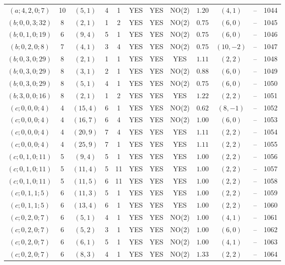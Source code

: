 \begin{longtable}{|c|c|c|c|c|c|c|c|c|c|c|c|}
$(a;4,2,0;7)$ & 10 & $(5,1)$ & 4 & 1 & YES & YES & NO(2) & $1.20$ & $(4,1)$ & -- & 1044\\
$(b;0,0,3;32)$ & 8 & $(2,1)$ & 1 & 2 & YES & YES & NO(2) & $0.75$ & $(6,0)$ & -- & 1045\\
$(b;0,1,0;19)$ & 6 & $(9,4)$ & 5 & 1 & YES & YES & NO(2) & $0.75$ & $(6,0)$ & -- & 1046\\
$(b;0,2,0;8)$ & 7 & $(4,1)$ & 3 & 4 & YES & YES & NO(2) & $0.75$ & $(10,-2)$ & -- & 1047\\
$(b;0,3,0;29)$ & 8 & $(2,1)$ & 1 & 1 & YES & YES & YES & $1.11$ & $(2,2)$ & -- & 1048\\
$(b;0,3,0;29)$ & 8 & $(3,1)$ & 2 & 1 & YES & YES & NO(2) & $0.88$ & $(6,0)$ & -- & 1049\\
$(b;0,3,0;29)$ & 8 & $(5,1)$ & 4 & 1 & YES & YES & NO(2) & $0.75$ & $(6,0)$ & -- & 1050\\
$(b;3,0,0;16)$ & 8 & $(2,1)$ & 1 & 2 & YES & YES & YES & $1.22$ & $(2,2)$ & -- & 1051\\
$(c;0,0,0;4)$ & 4 & $(15,4)$ & 6 & 1 & YES & YES & NO(2) & $0.62$ & $(8,-1)$ & -- & 1052\\
$(c;0,0,0;4)$ & 4 & $(16,7)$ & 6 & 4 & YES & YES & NO(2) & $1.00$ & $(6,0)$ & -- & 1053\\
$(c;0,0,0;4)$ & 4 & $(20,9)$ & 7 & 4 & YES & YES & YES & $1.11$ & $(2,2)$ & -- & 1054\\
$(c;0,0,0;4)$ & 4 & $(25,9)$ & 7 & 1 & YES & YES & YES & $1.11$ & $(2,2)$ & -- & 1055\\
$(c;0,1,0;11)$ & 5 & $(9,4)$ & 5 & 1 & YES & YES & YES & $1.00$ & $(2,2)$ & -- & 1056\\
$(c;0,1,0;11)$ & 5 & $(11,4)$ & 5 & 11 & YES & YES & YES & $1.00$ & $(2,2)$ & -- & 1057\\
$(c;0,1,0;11)$ & 5 & $(11,5)$ & 6 & 11 & YES & YES & YES & $1.00$ & $(2,2)$ & -- & 1058\\
$(c;0,1,1;5)$ & 6 & $(11,3)$ & 5 & 1 & YES & YES & YES & $1.00$ & $(2,2)$ & -- & 1059\\
$(c;0,1,1;5)$ & 6 & $(13,4)$ & 6 & 1 & YES & YES & YES & $1.00$ & $(2,2)$ & -- & 1060\\
$(c;0,2,0;7)$ & 6 & $(5,1)$ & 4 & 1 & YES & YES & NO(2) & $1.00$ & $(4,1)$ & -- & 1061\\
$(c;0,2,0;7)$ & 6 & $(5,2)$ & 3 & 1 & YES & YES & NO(2) & $1.00$ & $(6,0)$ & -- & 1062\\
$(c;0,2,0;7)$ & 6 & $(6,1)$ & 5 & 1 & YES & YES & NO(2) & $1.00$ & $(4,1)$ & -- & 1063\\
$(c;0,2,0;7)$ & 6 & $(8,3)$ & 4 & 1 & YES & YES & NO(2) & $1.33$ & $(2,2)$ & -- & 1064\\

\end{longtable}
